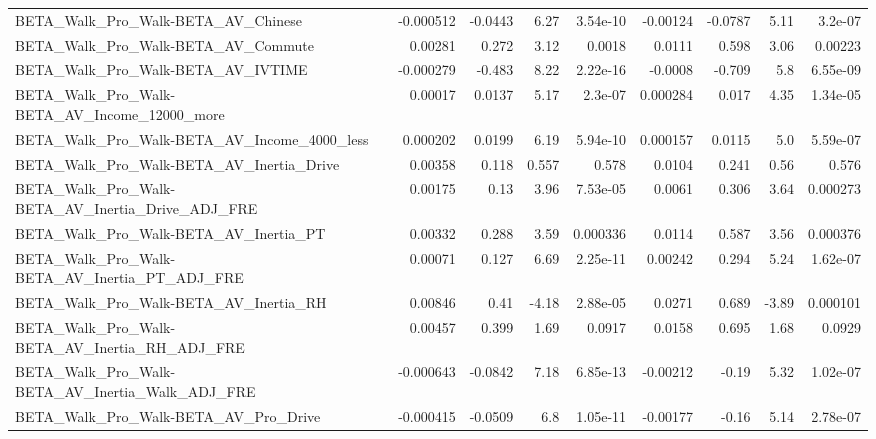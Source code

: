 \begin{tabular}{lrrrrrrrr}
BETA\_Walk\_Pro\_Walk-BETA\_AV\_Chinese                 &   -0.000512 &      -0.0443 &     6.27 & 3.54e-10 &   -0.00124 &     -0.0787 &         5.11 &       3.2e-07 \\
BETA\_Walk\_Pro\_Walk-BETA\_AV\_Commute                 &     0.00281 &        0.272 &     3.12 &   0.0018 &     0.0111 &       0.598 &         3.06 &       0.00223 \\
BETA\_Walk\_Pro\_Walk-BETA\_AV\_IVTIME                  &   -0.000279 &       -0.483 &     8.22 & 2.22e-16 &    -0.0008 &      -0.709 &          5.8 &      6.55e-09 \\
BETA\_Walk\_Pro\_Walk-BETA\_AV\_Income\_12000\_more       &     0.00017 &       0.0137 &     5.17 &  2.3e-07 &   0.000284 &       0.017 &         4.35 &      1.34e-05 \\
BETA\_Walk\_Pro\_Walk-BETA\_AV\_Income\_4000\_less        &    0.000202 &       0.0199 &     6.19 & 5.94e-10 &   0.000157 &      0.0115 &          5.0 &      5.59e-07 \\
BETA\_Walk\_Pro\_Walk-BETA\_AV\_Inertia\_Drive           &     0.00358 &        0.118 &    0.557 &    0.578 &     0.0104 &       0.241 &         0.56 &         0.576 \\
BETA\_Walk\_Pro\_Walk-BETA\_AV\_Inertia\_Drive\_ADJ\_FRE   &     0.00175 &         0.13 &     3.96 & 7.53e-05 &     0.0061 &       0.306 &         3.64 &      0.000273 \\
BETA\_Walk\_Pro\_Walk-BETA\_AV\_Inertia\_PT              &     0.00332 &        0.288 &     3.59 & 0.000336 &     0.0114 &       0.587 &         3.56 &      0.000376 \\
BETA\_Walk\_Pro\_Walk-BETA\_AV\_Inertia\_PT\_ADJ\_FRE      &     0.00071 &        0.127 &     6.69 & 2.25e-11 &    0.00242 &       0.294 &         5.24 &      1.62e-07 \\
BETA\_Walk\_Pro\_Walk-BETA\_AV\_Inertia\_RH              &     0.00846 &         0.41 &    -4.18 & 2.88e-05 &     0.0271 &       0.689 &        -3.89 &      0.000101 \\
BETA\_Walk\_Pro\_Walk-BETA\_AV\_Inertia\_RH\_ADJ\_FRE      &     0.00457 &        0.399 &     1.69 &   0.0917 &     0.0158 &       0.695 &         1.68 &        0.0929 \\
BETA\_Walk\_Pro\_Walk-BETA\_AV\_Inertia\_Walk\_ADJ\_FRE    &   -0.000643 &      -0.0842 &     7.18 & 6.85e-13 &   -0.00212 &       -0.19 &         5.32 &      1.02e-07 \\
BETA\_Walk\_Pro\_Walk-BETA\_AV\_Pro\_Drive               &   -0.000415 &      -0.0509 &      6.8 & 1.05e-11 &   -0.00177 &       -0.16 &         5.14 &      2.78e-07 \\

\end{tabular}

